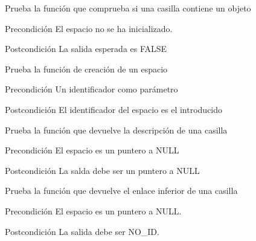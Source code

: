 \begin{DoxyRefList}
\item[\label{test__test000312}%
\hypertarget{test__test000312}{}%
Global \hyperlink{space__test_8c_a810a78e05e6ded6420d66113d7d9a567}{test2\-\_\-space\-\_\-contains\-\_\-object} ()]Prueba la función que comprueba si una casilla contiene un objeto \begin{DoxyPrecond}{Precondición}
El espacio no se ha inicializado. 
\end{DoxyPrecond}
\begin{DoxyPostcond}{Postcondición}
La salida esperada es F\-A\-L\-S\-E  
\end{DoxyPostcond}

\item[\label{test__test000240}%
\hypertarget{test__test000240}{}%
Global \hyperlink{space__test_8c_a012cd3cf37a8d91e2d7098a264c29d65}{test2\-\_\-space\-\_\-create} ()]Prueba la función de creación de un espacio \begin{DoxyPrecond}{Precondición}
Un identificador como parámetro 
\end{DoxyPrecond}
\begin{DoxyPostcond}{Postcondición}
El identificador del espacio es el introducido  
\end{DoxyPostcond}

\item[\label{test__test000277}%
\hypertarget{test__test000277}{}%
Global \hyperlink{space__test_8c_aebfa57e927e8f871e73425975c11976b}{test2\-\_\-space\-\_\-get\-\_\-description} ()]Prueba la función que devuelve la descripción de una casilla \begin{DoxyPrecond}{Precondición}
El espacio es un puntero a N\-U\-L\-L 
\end{DoxyPrecond}
\begin{DoxyPostcond}{Postcondición}
La salda debe ser un puntero a N\-U\-L\-L  
\end{DoxyPostcond}

\item[\label{test__test000302}%
\hypertarget{test__test000302}{}%
Global \hyperlink{space__test_8c_a4390a534575e1516d30140e8e40e3b52}{test2\-\_\-space\-\_\-get\-\_\-down} ()]Prueba la función que devuelve el enlace inferior de una casilla \begin{DoxyPrecond}{Precondición}
El espacio es un puntero a N\-U\-L\-L. 
\end{DoxyPrecond}
\begin{DoxyPostcond}{Postcondición}
La salida debe ser N\-O\-\_\-\-I\-D.  
\end{DoxyPostcond}


\end{DoxyRefList}
